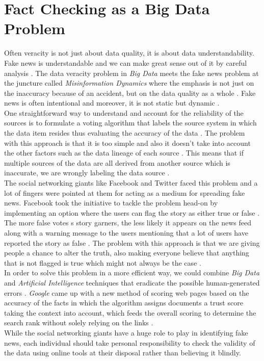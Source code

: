 \documentclass[sigconf]{acmart}
\begin{document}
\section{Fact Checking as a Big Data Problem}
Often veracity is not just about data quality, it is about data understandability. Fake news is understandable and we can make great sense out of it by careful analysis \cite{www-forbes2}. The data veracity problem in {\em Big Data} meets the fake news problem at the juncture called {\em Misinformation Dynamics} where the emphasis is not just on the inaccuracy because of an accident, but on the data quality as a whole \cite{www-forbes2}. Fake news is often intentional and moreover, it is not static but dynamic \cite{www-forbes2}.  \\
One straightforward way to understand and account for the reliability of the sources is to formulate a voting algorithm that labels the source system in which the data item resides thus evaluating the accuracy of the data \cite{www-forbes1}. The problem with this approach is that it is too simple and also it doesn't take into account the other factors such as the data lineage of each source \cite{www-forbes1}. This means that if multiple sources of the data are all derived from another source which is inaccurate, we are wrongly labeling the data source \cite{www-forbes1}. \\ 
The social networking giants like Facebook and Twitter faced this problem and a lot of fingers were pointed at them for acting as a medium for spreading fake news. Facebook took the initiative to tackle the problem head-on by implementing an option where the users can flag the story as either true or false \cite{www-forbes2}. The more false votes s story garners, the less likely it appears on the news feed along with a warning message to the users mentioning that a lot of users have reported the story as false \cite{www-forbes2}. The problem with this approach is that we are giving people a chance to alter the truth, also making everyone believe that anything that is not flagged is true which might not always be the case \cite{www-forbes2}. \\ 
In order to solve this problem in a more efficient way, we could combine {\em Big Data} and {\em Artificial Intelligence} techniques that eradicate the possible human-generated errors \cite{www-forbes2}. {\em Google} came up with a new method of scoring web pages based on the accuracy of the facts in which the algorithm assigns documents a trust score taking the context into account, which feeds the overall scoring to determine the search rank without solely relying on the links \cite{www-forbes2}. \\
While the social networking giants have a huge role to play in identifying fake news, each individual should take personal responsibility to check the validity of the data using online tools at their disposal rather than believing it blindly. 
\end{document}
